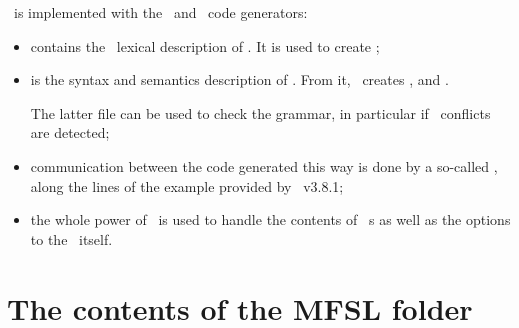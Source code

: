 \mfslLang\ is implemented with the \flex\ and \bison\ code generators:
\begin{itemize}
\item {} contains the \flex\ lexical description of \mfslLang. It is used to create ;

\item {} is the syntax and semantics description of \mfslLang. From it, \bison\ creates ,  and . 

The latter file can be used to check the grammar, in particular if \LR\ conflicts are detected;

\item communication between the code generated this way is done by a so-called , along the lines of the  example provided by \bison\ v3.8.1;

\item the whole power of \oahRepr\ is used to handle the contents of \mfslLang\ \script s as well as the options to the \mfslLangInterp\ itself.
\end{itemize}


\section{The contents of the MFSL folder}


